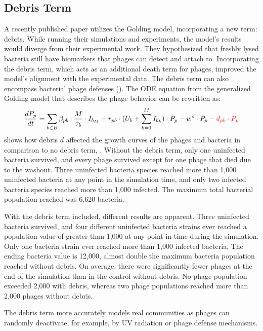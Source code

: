 \subsection{Debris Term}
\label{sec:results:debris}
A recently published paper \citet{deyEmergentHigherorderInteractions2025} utilizes the Golding model, incorporating a new term: debris. While running their simulations and experiments, the model’s results would diverge from their experimental work. 
They hypothesized that freshly lysed bacteria still have biomarkers that phages can detect and attach to. 
Incorporating the debris term, which acts as an additional death term for phages, improved the model’s alignment with the experimental data.
The debris term can also encompass bacterial phage defenses (). 
The ODE equation from the generalized Golding model that describes the phage behavior can be rewritten as: 
\[
    \frac{dP_p}{dt} = \sum_{b\in B}\beta_{p b}\cdot\frac{M}{\tau_b} \cdot I_{b_M} - r_{p b}\cdot(U_b + \sum_{k=1}^{M} I_{b_k})\cdot P_p - w^o \cdot P_p \mathcolor{red}{- d_{pb} \cdot P_p}
\]
 shows how debris $d$ affected the growth curves of the phages and bacteria in comparison to no debris term, . 
Without the debris term, only one uninfected bacteria survived, and every phage survived except for one phage that died due to the washout. 
Three uninfected bacteria species reached more than 1,000 uninfected bacteria at any point in the simulation time, and only two infected bacteria species reached more than 1,000 infected. 
The maximum total bacterial population reached was 6,620 bacteria. 

With the debris term included, different results are apparent. 
Three uninfected bacteria survived, and four different uninfected bacteria strains ever reached a population value of greater than 1,000 at any point in time during the simulation. 
Only one bacteria strain ever reached more than 1,000 infected bacteria, 
The ending bacteria value is 12,000, almost double the maximum bacteria population reached without debris. 
On average, there were significantly fewer phages at the end of the simulation than in the control without debris. 
No phage population exceeded 2,000 with debris, whereas two phage populations reached more than 2,000 phages without debris. 

The debris term more accurately models real communities as phages can randomly deactivate, for example, by UV radiation or phage defense mechanisms. 


